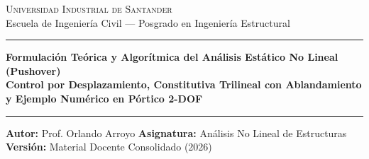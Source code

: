 \documentclass[11pt,letterpaper]{article}
\begin{document}
\begin{center}
    {\scshape\Large Universidad Industrial de Santander}\\[0.2cm]
    {\large Escuela de Ingeniería Civil --- Posgrado en Ingeniería Estructural}\\[0.35cm]
    {\color{uispurple}\hrule height 2pt}\vspace{0.4cm}
    {\huge\bfseries\color{uisdark} Formulación Teórica y Algorítmica del Análisis Estático No Lineal (Pushover)}\\[0.25cm]
    {\Large\bfseries\color{uispurple} Control por Desplazamiento, Constitutiva Trilineal con Ablandamiento y Ejemplo Numérico en Pórtico 2-DOF}\\[0.35cm]
    {\color{uispurple}\hrule height 1pt}\vspace{0.35cm}
    {\textbf{Autor:} Prof. Orlando Arroyo}\quad\textbullet\quad
    {\textbf{Asignatura:} Análisis No Lineal de Estructuras}\quad\textbullet\quad
    {\textbf{Versión:} Material Docente Consolidado (2026)}
\end{center}

\vspace{0.2cm}

\begin{abstract}
\noindent El presente documento presenta la derivación rigurosa de la teoría del análisis estático no lineal monótono incremental (\textit{Pushover}) aplicado a sistemas estructurales discretizados. Se fundamenta la necesidad ineludible del algoritmo de control por desplazamiento para trazar curvas de capacidad que exhiben degradación de resistencia (\textit{softening} post-pico con rigidez tangente negativa $k_t < 0$), demostrando analíticamente por qué los esquemas controlados por carga colapsan numéricamente por singularidad jacobiana (\textit{snap-through}). Se incorpora un modelo constitutivo trilineal por entrepiso que incluye ramas elástica, de endurecimiento plástico, de ablandamiento descendente y meseta residual. Finalmente, se desarrolla de forma analítica y numérica el cálculo detallado de los primeros pasos incrementales de empuje y se demuestra formalmente el fenómeno físico de localización de deformaciones en piso blando acompañado por la descarga elástica reversible del piso superior.
\end{abstract}

\vspace{0.2cm}

\end{document}

